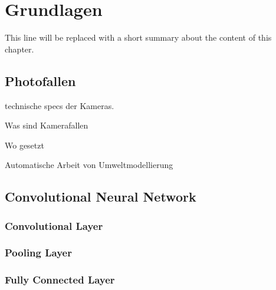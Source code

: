 \chapter{Grundlagen}

This line will be replaced with a short summary about the content of this chapter.

\section{Photofallen}

technische specs der Kameras.

Was sind Kamerafallen

Wo gesetzt

Automatische Arbeit von Umweltmodellierung

\section{Convolutional Neural Network}

\subsection{Convolutional Layer}

\subsection{Pooling Layer}

\subsection{Fully Connected Layer}